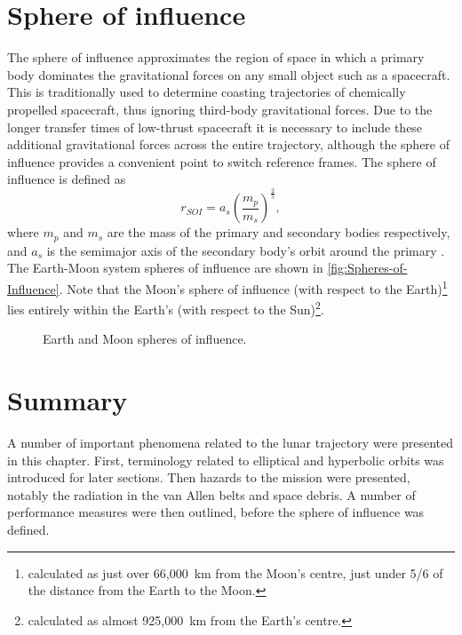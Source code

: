 \section{Sphere of influence} \label{sec:SOI}
The sphere of influence approximates the region of space in which a primary body dominates the gravitational forces on any small object such as a spacecraft. This is traditionally used to determine coasting trajectories of chemically propelled spacecraft, thus ignoring third-body gravitational forces. Due to the longer transfer times of low-thrust spacecraft it is necessary to include these additional gravitational forces across the entire trajectory, although the sphere of influence provides a convenient point to switch reference frames. The sphere of influence is defined as
\begin{equation}
r_{SOI}=a_{s}\left(\frac{m_{p}}{m_{s}}\right)^{\frac{2}{5}} \label{eq:SOI},
\end{equation}
where $m_{p}$ and $m_{s}$ are the mass of the primary and secondary bodies respectively, and $a_{s}$ is the semimajor axis of the secondary body's orbit around the primary \parencite{Kemble2006}. The Earth-Moon system spheres of influence are shown in \autoref{fig:Spheres-of-Influence}.
 Note that the Moon's sphere of influence (with respect to the Earth)\footnote{calculated as just over 66,000~km from the Moon's centre, just under 5/6 of the distance from the Earth to the Moon.} lies entirely within the Earth's (with respect to the Sun)\footnote{calculated as almost 925,000~km from the Earth's centre.}.

\begin{figure} [h]
\centering
\def\svgwidth{\figurewidth}

\caption{Earth and Moon spheres of influence.} \label{fig:Spheres-of-Influence}
\end{figure}

\section{Summary} \label{sec:Rocket-science-summary}

A number of important phenomena related to the lunar trajectory were presented in this chapter. First, terminology related to elliptical and hyperbolic orbits was introduced for later sections. Then hazards to the mission were presented, notably the radiation in the van Allen belts and space debris. A number of performance measures were then outlined, before the sphere of influence was defined.
